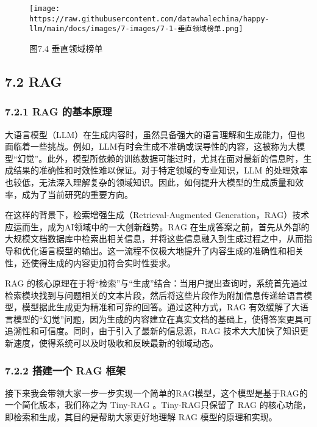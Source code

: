 \documentclass[12pt,a4paper]{book}
\begin{document}
\begin{figure}[htbp]\centering
\texttt{[image: https://raw.githubusercontent.com/datawhalechina/happy-llm/main/docs/images/7-images/7-1-垂直领域榜单.png]}
\caption{图7.4 垂直领域榜单}
\end{figure}

\subsection{7.2 RAG}\label{rag}

\subsubsection{7.2.1 RAG
的基本原理}\label{rag-ux7684ux57faux672cux539fux7406}

大语言模型（LLM）在生成内容时，虽然具备强大的语言理解和生成能力，但也面临着一些挑战。例如，LLM有时会生成不准确或误导性的内容，这被称为大模型``幻觉''。此外，模型所依赖的训练数据可能过时，尤其在面对最新的信息时，生成结果的准确性和时效性难以保证。对于特定领域的专业知识，LLM
的处理效率也较低，无法深入理解复杂的领域知识。因此，如何提升大模型的生成质量和效率，成为了当前研究的重要方向。

在这样的背景下，检索增强生成（Retrieval-Augmented
Generation，RAG）技术应运而生，成为AI领域中的一大创新趋势。RAG
在生成答案之前，首先从外部的大规模文档数据库中检索出相关信息，并将这些信息融入到生成过程之中，从而指导和优化语言模型的输出。这一流程不仅极大地提升了内容生成的准确性和相关性，还使得生成的内容更加符合实时性要求。

RAG
的核心原理在于将``检索''与``生成''结合：当用户提出查询时，系统首先通过检索模块找到与问题相关的文本片段，然后将这些片段作为附加信息传递给语言模型，模型据此生成更为精准和可靠的回答。通过这种方式，RAG
有效缓解了大语言模型的``幻觉''问题，因为生成的内容建立在真实文档的基础上，使得答案更具可追溯性和可信度。同时，由于引入了最新的信息源，RAG
技术大大加快了知识更新速度，使得系统可以及时吸收和反映最新的领域动态。

\subsubsection{7.2.2 搭建一个 RAG
框架}\label{ux642dux5efaux4e00ux4e2a-rag-ux6846ux67b6}

接下来我会带领大家一步一步实现一个简单的RAG模型，这个模型是基于RAG的一个简化版本，我们称之为
Tiny-RAG 。Tiny-RAG只保留了 RAG
的核心功能，即检索和生成，其目的是帮助大家更好地理解 RAG
模型的原理和实现。
\end{document}
